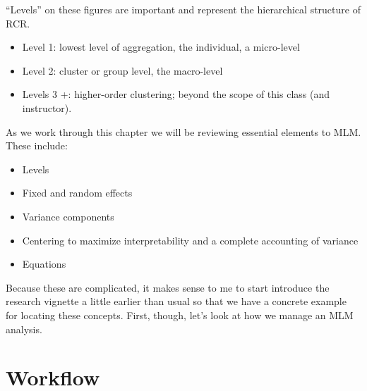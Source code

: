 \documentclass[
  11pt,
]{book}
\providecommand{\tightlist}{%
  \setlength{\itemsep}{0pt}\setlength{\parskip}{0pt}}
\begin{document}
``Levels'' on these figures are important and represent the hierarchical structure of RCR.

\begin{itemize}
\tightlist
\item
  Level 1: lowest level of aggregation, the individual, a micro-level
\item
  Level 2: cluster or group level, the macro-level
\item
  Levels 3 +: higher-order clustering; beyond the scope of this class (and instructor).
\end{itemize}

As we work through this chapter we will be reviewing essential elements to MLM. These include:

\begin{itemize}
\tightlist
\item
  Levels
\item
  Fixed and random effects
\item
  Variance components
\item
  Centering to maximize interpretability and a complete accounting of variance
\item
  Equations
\end{itemize}

Because these are complicated, it makes sense to me to start introduce the research vignette a little earlier than usual so that we have a concrete example for locating these concepts. First, though, let's look at how we manage an MLM analysis.

\hypertarget{workflow}{%
\section{Workflow}\label{workflow}}
\end{document}
